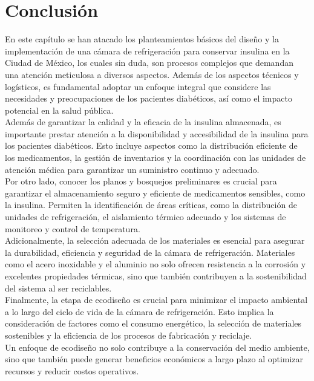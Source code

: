 \newpage
\section{Conclusión}

En este capítulo se han atacado los planteamientos básicos del diseño y la implementación de una cámara de refrigeración para conservar insulina en la Ciudad de México, los cuales sin duda, son procesos complejos que demandan una atención meticulosa a diversos aspectos. Además de los aspectos técnicos y logísticos, es fundamental adoptar un enfoque integral que considere las necesidades y preocupaciones de los pacientes diabéticos, así como el impacto potencial en la salud pública.\\ 
Además de garantizar la calidad y la eficacia de la insulina almacenada, es importante prestar atención a la disponibilidad y accesibilidad de la insulina para los pacientes diabéticos. Esto incluye aspectos como la distribución eficiente de los medicamentos, la gestión de inventarios y la coordinación con las unidades de atención médica para garantizar un suministro continuo y adecuado. \\
Por otro lado, conocer los planos y bosquejos preliminares es crucial para garantizar el almacenamiento seguro y eficiente de medicamentos sensibles, como la insulina. Permiten la identificación de áreas críticas, como la distribución de unidades de refrigeración, el aislamiento térmico adecuado y los sistemas de monitoreo y control de temperatura.\\ 
Adicionalmente, la selección adecuada de los materiales es esencial para asegurar la durabilidad, eficiencia y seguridad de la cámara de refrigeración. Materiales como el acero inoxidable y el aluminio no solo ofrecen resistencia a la corrosión y excelentes propiedades térmicas, sino que también contribuyen a la sostenibilidad del sistema al ser reciclables.\\ 
Finalmente, la etapa de ecodiseño es crucial para minimizar el impacto ambiental a lo largo del ciclo de vida de la cámara de refrigeración. Esto implica la consideración de factores como el consumo energético, la selección de materiales sostenibles y la eficiencia de los procesos de fabricación y reciclaje.\\
Un enfoque de ecodiseño no solo contribuye a la conservación del medio ambiente, sino que también puede generar beneficios económicos a largo plazo al optimizar recursos y reducir costos operativos.





